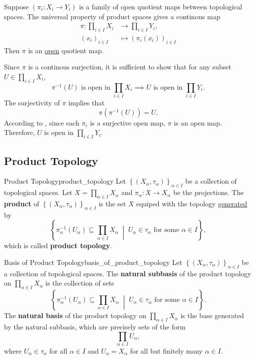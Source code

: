 \documentclass{report}
\begin{document}
\begin{proposition}{}{}
	Suppose $(\pi_i:X_i \to Y_i)$ is a family of open quotient maps between topological spaces. The universal property of product spaces gives a continous map
	\begin{align*}
		\pi: \prod_{i \in I} X_i & \longrightarrow \prod_{i \in I} Y_i, \\
		(x_i)_{i \in I}          & \longmapsto (\pi_i(x_i))_{i \in I}
	\end{align*}
	Then $\pi$ is an \hyperref[th:open_map]{open} quotient map.
\end{proposition}
\begin{prf}
	Since $\pi$ is a continous surjection, it is sufficient to show that for any subset $U\in \prod_{i \in I} X_i$,
	\[
		\pi^{-1}(U)\text{ is open in }\prod_{i \in I} X_i \implies U\text{ is open in }\prod_{i \in I} Y_i.
	\]
	The surjectivity of $\pi$ implies that 
	\[
	\pi(\pi^{-1}(U))=U.
	\]
	According to , since each $\pi_i$ is a surjective open map, $\pi$ is an open map. Therefore, $U$ is open in $\prod_{i \in I} Y_i$.

\end{prf}

\subsection{Product Topology}
\begin{definition}{Product Topology}{product_topology}
	Let $\left\{(X_\alpha,\tau_\alpha)\right\}_{\alpha\in I}$ be a collection of topological spaces. Let $X=\prod_{\alpha\in I}X_\alpha$ and $\pi_\alpha:X\to X_\alpha$ be the projections. The \textbf{product} of $\left\{(X_\alpha,\tau_\alpha)\right\}_{\alpha\in I}$ is the set $X$ equiped with the topology \hyperref[th:generated_topology]{generated} by
	\[
		\left\{\pi_\alpha^{-1}(U_\alpha)\subseteq\prod_{\alpha\in I}X_\alpha\;\middle|\; U_\alpha\in \tau_\alpha\text{ for some }\alpha\in I\right\},
	\]
	which is called \textbf{product topology}.
\end{definition}

\begin{definition}{Basis of Product Topology}{basis_of_product_topology}
	Let $\left\{(X_\alpha,\tau_\alpha)\right\}_{\alpha\in I}$ be a collection of topological spaces. The \textbf{natural subbasis} of the product topology on $\prod_{\alpha\in I}X_\alpha$ is the collection of sets 
	\[
		\left\{\pi_\alpha^{-1}(U_\alpha)\subseteq\prod_{\alpha\in I}X_\alpha\;\middle|\; U_\alpha\in \tau_\alpha\text{ for some }\alpha\in I\right\}.
	\]
	The \textbf{natural basis} of the product topology on $\prod_{\alpha\in I}X_\alpha$ is the base generated by the natural subbasis, which are precisely sets of the form
	\[
		\prod_{\alpha\in I}U_\alpha,
	\]
	where $U_\alpha\in \tau_\alpha$ for all $\alpha\in I$ and $U_\alpha=X_\alpha$ for all but finitely many $\alpha\in I$.
\end{definition}
\end{document}
